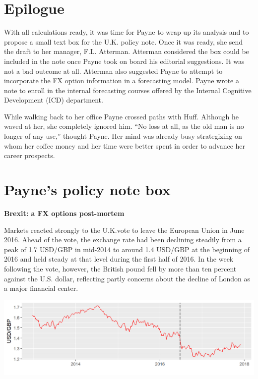 \documentclass[]{book}
\theoremstyle{definition}
\theoremstyle{definition}
\theoremstyle{definition}
\theoremstyle{remark}
\begin{document}
\chapter{Epilogue}\label{epilogue}

With all calculations ready, it was time for Payne to wrap up its
analysis and to propose a small text box for the U.K. policy note. Once
it was ready, she send the draft to her manager, F.L. Atterman. Atterman
considered the box could be included in the note once Payne took on
board his editorial suggestions. It was not a bad outcome at all.
Atterman also suggested Payne to attempt to incorporate the FX option
information in a forecasting model. Payne wrote a note to enroll in the
internal forecasting courses offered by the Internal Cognitive
Development (ICD) department.

While walking back to her office Payne crossed paths with Huff. Although
he waved at her, she completely ignored him. ``No loss at all, as the
old man is no longer of any use,'' thought Payne. Her mind was already
busy strategizing on whom her coffee money and her time were better
spent in order to advance her career prospects.

\appendix


\chapter{Payne's policy note box}\label{paynes-policy-note-box}

 \textbf{Brexit: a FX options post-mortem}

Markets reacted strongly to the U.K.vote to leave the European Union in
June 2016. Ahead of the vote, the exchange rate had been declining
steadily from a peak of 1.7 USD/GBP in mid-2014 to around 1.4 USD/GBP at
the beginning of 2016 and held steady at that level during the first
half of 2016. In the week following the vote, however, the British pound
fell by more than ten percent against the U.S. dollar, reflecting partly
concerns about the decline of London as a major financial center.

\includegraphics[width=1\linewidth]{images/unnamed-chunk-69-1}
\end{document}

